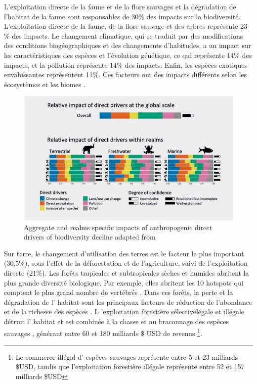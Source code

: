 \begin{displayquote}
\begin{displayquote}
\begin{displayquote}
%
L'exploitation directe de la faune et de la flore sauvages et la dégradation de l'habitat de la faune sont responsables de 30\% des impacts sur la biodiversité. L'exploitation directe de la faune, de la flore sauvage et des arbres représente 23 \% des impacts. Le changement climatique, qui se traduit par des modifications des conditions biogéographiques et des changements d'habitudes, a un impact sur les caractéristiques des espèces et l'évolution génétique, ce qui représente 14\% des impacts, et la pollution représente 14\% des impacts. Enfin, les espèces exotiques envahissantes représentent 11\%. Ces facteurs ont des impacts différents selon les écosystèmes et les biomes \citep{ipbes_2022_6417333}. 

\begin{figure}[h]
	\centering
	\includegraphics[width = .95 \textwidth]{figures/intro/intro_impactsfin.jpg}
	\caption{Aggregate and realms specific impacts of anthropogenic direct drivers of biodiversity decline adapted from \citep{ipbes_2022_6417333}}
	\label{fig:intro_impacts}
\end{figure}

Sur terre, le changement d'utilisation des terres est le facteur le plus important (30,5\%), sous l'effet de la déforestation et de l'agriculture, suivi de l'exploitation directe (21\%).     Les forêts tropicales et subtropicales sèches et humides abritent la plus grande diversité biologique. Par exemple, elles abritent les 10 hotspots qui comptent le plus grand nombre de vertébrés \citep{mittermeier_global_2011}. Dans ces forêts, la perte et la dégradation de l' habitat sont les principaux facteurs de réduction de l'abondance et de la richesse des espèces \citep{newbold_global_2014}. L 'exploitation forestière sélectivelégale et illégale détruit l' habitat \citep{hoare2022establishing, bousfield_2023_large} et est combinée à la chasse et au braconnage des espèces sauvages \citep{gallego_2020_combined}, générant entre 60 et 180 milliards \$ USD de revenus \citep{gfi_2017}\footnote{Le commerce illégal d' espèces sauvages représente entre 5 et 23 milliards \$USD, tandis que l'exploitation forestière illégale représente entre 52 et 157 milliards \$USD}. 


\end{displayquote}
\end{displayquote}
\end{displayquote}
